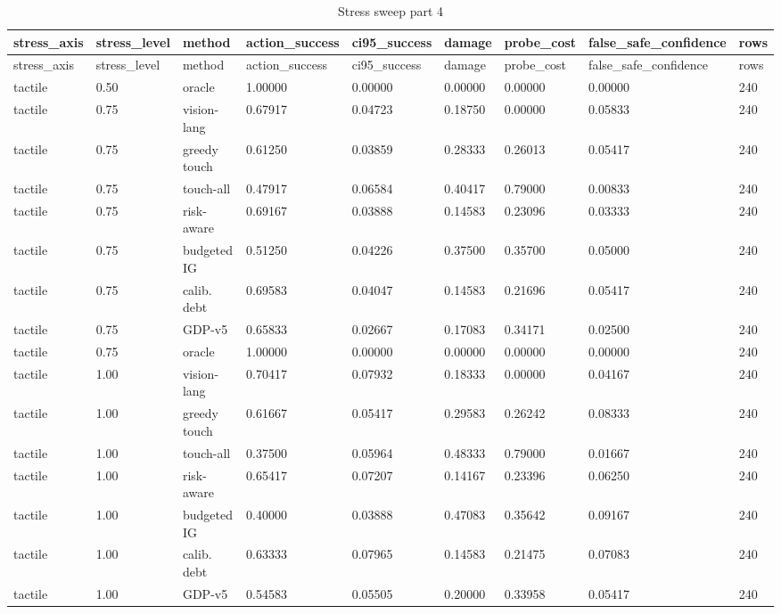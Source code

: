 \documentclass{article}
\begin{document}
\begin{center}
\tiny
\renewcommand{\arraystretch}{0.92}
\setlength{\tabcolsep}{3pt}
\begin{longtable}{lllllllll}
\caption{Stress sweep part 4}\label{tab:stress-sweep-4}\\
\toprule
stress\_axis & stress\_level & method & action\_success & ci95\_success & damage & probe\_cost & false\_safe\_confidence & rows \\
\midrule
\endfirsthead
\toprule
stress\_axis & stress\_level & method & action\_success & ci95\_success & damage & probe\_cost & false\_safe\_confidence & rows \\
\midrule
\endhead
tactile & 0.50 & oracle & 1.00000 & 0.00000 & 0.00000 & 0.00000 & 0.00000 & 240 \\
tactile & 0.75 & vision-lang & 0.67917 & 0.04723 & 0.18750 & 0.00000 & 0.05833 & 240 \\
tactile & 0.75 & greedy touch & 0.61250 & 0.03859 & 0.28333 & 0.26013 & 0.05417 & 240 \\
tactile & 0.75 & touch-all & 0.47917 & 0.06584 & 0.40417 & 0.79000 & 0.00833 & 240 \\
tactile & 0.75 & risk-aware & 0.69167 & 0.03888 & 0.14583 & 0.23096 & 0.03333 & 240 \\
tactile & 0.75 & budgeted IG & 0.51250 & 0.04226 & 0.37500 & 0.35700 & 0.05000 & 240 \\
tactile & 0.75 & calib. debt & 0.69583 & 0.04047 & 0.14583 & 0.21696 & 0.05417 & 240 \\
tactile & 0.75 & GDP-v5 & 0.65833 & 0.02667 & 0.17083 & 0.34171 & 0.02500 & 240 \\
tactile & 0.75 & oracle & 1.00000 & 0.00000 & 0.00000 & 0.00000 & 0.00000 & 240 \\
tactile & 1.00 & vision-lang & 0.70417 & 0.07932 & 0.18333 & 0.00000 & 0.04167 & 240 \\
tactile & 1.00 & greedy touch & 0.61667 & 0.05417 & 0.29583 & 0.26242 & 0.08333 & 240 \\
tactile & 1.00 & touch-all & 0.37500 & 0.05964 & 0.48333 & 0.79000 & 0.01667 & 240 \\
tactile & 1.00 & risk-aware & 0.65417 & 0.07207 & 0.14167 & 0.23396 & 0.06250 & 240 \\
tactile & 1.00 & budgeted IG & 0.40000 & 0.03888 & 0.47083 & 0.35642 & 0.09167 & 240 \\
tactile & 1.00 & calib. debt & 0.63333 & 0.07965 & 0.14583 & 0.21475 & 0.07083 & 240 \\
tactile & 1.00 & GDP-v5 & 0.54583 & 0.05505 & 0.20000 & 0.33958 & 0.05417 & 240 \\

\end{longtable}
\end{center}
\end{document}
